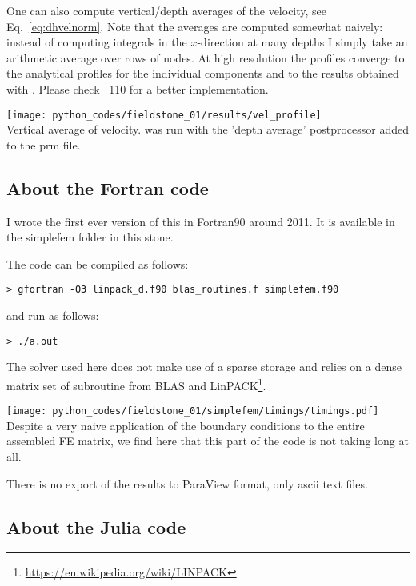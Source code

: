 One can also compute vertical/depth averages of the velocity, see Eq.~\eqref{eq:dhvelnorm}.
Note that the averages are computed somewhat naively: instead of computing integrals in the $x$-direction
at many depths I simply take an arithmetic average over rows of nodes. At high resolution the profiles
converge to the analytical profiles for the individual components and to the results 
obtained with \aspect. Please check \stone~110 for a better implementation.
\begin{center}
\texttt{[image: python\_codes/fieldstone\_01/results/vel\_profile]}\\
{\captionfont Vertical average of velocity. \aspect was run with the 'depth average' postprocessor
added to the prm file.}
\end{center}

\newpage
\subsection*{About the Fortran code}

I wrote the first ever version of this \stone in
Fortran90 around 2011. It is available in the {\foldernamefont simplefem} folder in this stone.

The code can be compiled as follows:
\begin{verbatim}
> gfortran -O3 linpack_d.f90 blas_routines.f simplefem.f90
\end{verbatim}
and run as follows:
\begin{verbatim}
> ./a.out 
\end{verbatim}
The solver used here does not make use of a sparse storage and relies on a dense matrix 
set of subroutine from BLAS and LinPACK\footnote{\url{https://en.wikipedia.org/wiki/LINPACK}}.
\begin{center}
\texttt{[image: python\_codes/fieldstone\_01/simplefem/timings/timings.pdf]}\\
{\captionfont Despite a very naive application of the boundary conditions to the entire
assembled FE matrix, we find here that this part of the code is not taking long at all.}
\end{center}
There is no export of the results to ParaView format, only ascii text files.



\newpage
\subsection*{About the Julia code}

